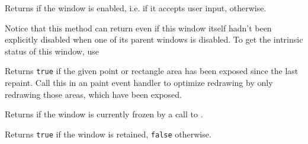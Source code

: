 
Returns \true if the window is enabled, i.e. if it accepts user input, \false 
otherwise.

Notice that this method can return \false even if this window itself hadn't
been explicitly disabled when one of its parent windows is disabled. To get the
intrinsic status of this window, use 




\label{wxwindowisexposed}





Returns {\tt true} if the given point or rectangle area has been exposed since the
last repaint. Call this in an paint event handler to optimize redrawing by
only redrawing those areas, which have been exposed.



\label{wxwindowisfrozen}


Returns \true if the window is currently frozen by a call to 
.




\label{wxwindowisretained}


Returns {\tt true} if the window is retained, {\tt false} otherwise.

